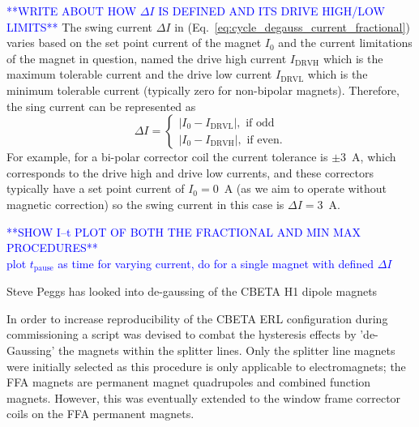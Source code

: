 \documentclass[../main.tex]{subfiles}
\begin{document}
\textcolor{blue}{**WRITE ABOUT HOW $\Delta I$ IS DEFINED AND ITS DRIVE HIGH/LOW LIMITS**}
The swing current $\Delta I$ in (Eq.~\ref{eq:cycle_degauss_current_fractional}) varies based on the set point current of the magnet $I_{0}$ and the current limitations of the magnet in question, named the drive high current $I_{\mathrm{DRVH}}$ which is the maximum tolerable current and the drive low current $I_{\mathrm{DRVL}}$ which is the minimum tolerable current (typically zero for non-bipolar magnets). Therefore, the sing current can be represented as
\begin{equation}
\Delta I =
\begin{cases}
\left|I_{0}-I_{\mathrm{DRVL}}\right|, \text{ if odd} \\
\left|I_{0}-I_{\mathrm{DRVH}}\right|, \text{ if even.}
\end{cases}
\label{eq:swing_current_variation}
\end{equation}
For example, for a bi-polar corrector coil the current tolerance is $\pm 3$~\si{\ampere}, which corresponds to the drive high and drive low currents, and these correctors typically have a set point current of $I_{0} = 0$~\si{\ampere} (as we aim to operate without magnetic correction) so the swing current in this case is $\Delta I = 3$~\si{\ampere}.     

\textcolor{blue}{**SHOW I--t PLOT OF BOTH THE FRACTIONAL AND MIN MAX PROCEDURES** \\ plot $t_{\mathrm{pause}}$ as time for varying current, do for a single magnet with defined $\Delta I$}

Steve Peggs has looked into de-gaussing of the CBETA H1 dipole magnets \cite{fabus2019hysteresis}

In order to increase reproducibility of the CBETA ERL configuration during commissioning a script was devised to combat the hysteresis effects by 'de-Gaussing' the magnets within the splitter lines. Only the splitter line magnets were initially selected as this procedure is only applicable to electromagnets; the FFA magnets are permanent magnet quadrupoles and combined function magnets. However, this was eventually extended to the window frame corrector coils on the FFA permanent magnets.
\end{document}
